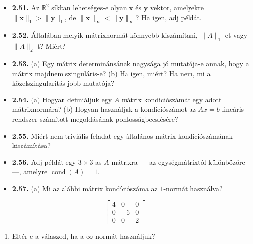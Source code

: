 \documentclass[
  magyar,
  11pt]{article}
\providecommand{\tightlist}{%
  \setlength{\itemsep}{0pt}\setlength{\parskip}{0pt}}
\providecommand{\boldsymbol}[1]{\mathbf{#1}}
\begin{document}
\begin{itemize}
  \(\|\boldsymbol{x}\|_1 = \|\boldsymbol{x}\|_\infty\)? Ha igen, adj
  példát.
\item
  \textbf{2.51.} Az \(\mathbb{R}^2\) síkban lehetséges-e olyan
  \(\boldsymbol{x}\) és \(\boldsymbol{y}\) vektor, amelyekre
  \(\|\boldsymbol{x}\|_1 > \|\boldsymbol{y}\|_1\), de
  \(\|\boldsymbol{x}\|_\infty < \|\boldsymbol{y}\|_\infty\)? Ha igen,
  adj példát.
\item
  \textbf{2.52.} Általában melyik mátrixnormát könnyebb kiszámítani,
  \(\|A\|_1\)-et vagy \(\|A\|_2\)-t? Miért?
\item
  \textbf{2.53.} (a) Egy mátrix determinánsának nagysága jó mutatója-e
  annak, hogy a mátrix majdnem szinguláris-e? (b) Ha igen, miért? Ha
  nem, mi a közelszingularitás jobb mutatója?
\item
  \textbf{2.54.} (a) Hogyan definiáljuk egy \(A\) mátrix kondíciószámát
  egy adott mátrixnormára? (b) Hogyan használjuk a kondíciószámot az
  \(Ax = b\) lineáris rendszer számított megoldásának
  pontosságbecslésére?
\item
  \textbf{2.55.} Miért nem triviális feladat egy általános mátrix
  kondíciószámának kiszámítása?
\item
  \textbf{2.56.} Adj példát egy \(3 \times 3\)-as \(A\) mátrixra --- az
  egységmátrixtól különbözőre ---, amelyre
  \(\operatorname{cond}(A) = 1\).
\item
  \textbf{2.57.} (a) Mi az alábbi mátrix kondíciószáma az \(1\)-normát
  használva?
\end{itemize}

\[\begin{bmatrix} 4 & 0 & 0 \\ 0 & -6 & 0 \\ 0 & 0 & 2 \end{bmatrix}\]

\begin{enumerate}
\def\labelenumi{(\alph{enumi})}
\setcounter{enumi}{1}
\tightlist
\item
  Eltér-e a válaszod, ha a \(\infty\)-normát használjuk?
\end{enumerate}
\end{document}
